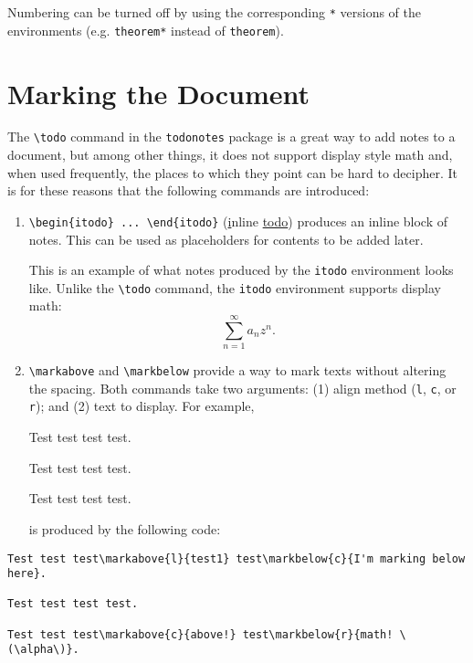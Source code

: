 \documentclass[12pt,oneside,letterpaper]{amsart}
\begin{document}
Numbering can be turned off by using the corresponding \verb|*| versions of the environments (e.g. \verb|theorem*| instead of \verb|theorem|). 


\section{Marking the Document}
\label{sec:marking}
The \verb|\todo| command in the \verb|todonotes| package is a great way to add notes to a document, but among other things, it does not support display style math and, when used frequently, the places to which they point can be hard to decipher. 
It is for these reasons that the following commands are introduced:
\begin{enumerate}[label=(\alph*)]
  \item \verb|\begin{itodo} ... \end{itodo}| (\underline{i}nline \underline{todo}) produces an inline block of notes. 
    This can be used as placeholders for contents to be added later. 
    \begin{itodo}
      This is an example of what notes produced by the \texttt{itodo} environment looks like. 
        Unlike the \texttt{\textbackslash todo} command, the \texttt{itodo} environment supports display math:
      \[
        \sum_{n=1}^{\infty} a_n z^n . 
      \] 
    \end{itodo}
  \item \verb|\markabove| and \verb|\markbelow| provide a way to mark texts without altering the spacing. 
  Both commands take two arguments: (1) align method (\verb|l|, \verb|c|, or \verb|r|); and (2) text to display. 
  For example, 

  \begin{mdframed}
    \noindent
    Test test test test.

    \noindent
    Test test test test.

    \noindent
    Test test test test.
  \end{mdframed}
  is produced by the following code:
\end{enumerate}
\begin{verbatim}
Test test test\markabove{l}{test1} test\markbelow{c}{I'm marking below here}.

Test test test test.

Test test test\markabove{c}{above!} test\markbelow{r}{math! \(\alpha\)}.
\end{verbatim}
\end{document}
